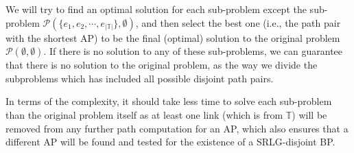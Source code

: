 We will try to find an optimal solution for each sub-problem except the sub-problem $\mathcal{P}(\{e_1,e_2,\cdots ,{e_{\left| \mathbb{T} \right|}}\},\emptyset)$, and then select the best one (i.e., the path pair with the shortest AP) to be the final (optimal) solution to the original problem $\mathcal{P}(\emptyset,\emptyset)$. If there is no solution to any of these sub-problems, we can guarantee that there is no solution to the original problem, as the way we divide the subproblems which has included  all possible disjoint path pairs.


In terms of the complexity, it should take less time to solve each sub-problem than the original problem itself as at least one link (which is from $\mathbb{T}$) will be removed from any further path computation for an AP, which also ensures that a different AP will be found and tested for the existence of a SRLG-disjoint BP.

